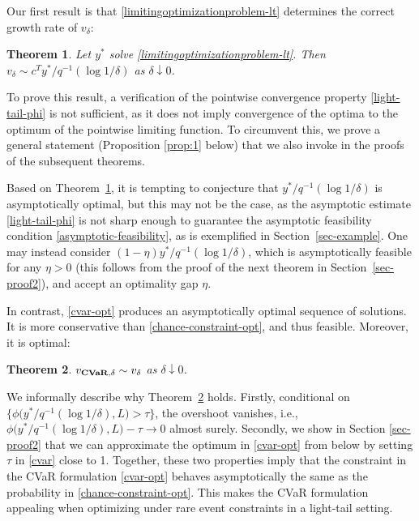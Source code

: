 \documentclass[a4paper, a4wide, 10pt, reqno]{amsart}
\theoremstyle{plain}
\newtheorem{theorem}{Theorem}
\begin{document}
\smallskip
Our first result is that \eqref{limitingoptimizationproblem-lt} determines the correct growth rate of $v_\delta$:
\begin{theorem}\label{thm:lt-ccp}
Let $y^*$ solve \eqref{limitingoptimizationproblem-lt}. 
Then  
$v_\delta\sim c^T y^*/q^{-1}(\log 1/\delta) $ as $\delta\downarrow 0$.
\end{theorem}

To prove this result, a verification of the pointwise convergence property \eqref{light-tail-phi} is not sufficient, as it does not imply convergence of the optima to the optimum of the pointwise limiting function. To circumvent this, we prove a general statement (Proposition \ref{prop:1} below) that we also invoke in the proofs of the subsequent theorems.

\smallskip
Based on Theorem~\ref{thm:lt-ccp}, it is tempting to conjecture that $y^*/q^{-1}(\log 1/\delta)$ is asymptotically optimal, but this may not be the case, as the asymptotic estimate \eqref{light-tail-phi} is not sharp enough to guarantee the asymptotic feasibility condition \eqref{asymptotic-feasibility}, as is exemplified in Section~\ref{sec-example}. One may instead consider $(1-\eta) y^*/q^{-1}(\log 1/\delta)$, which is asymptotically feasible for any $\eta>0$ (this follows from the proof of the next theorem in Section~\ref{sec-proof2}), and accept an optimality gap $\eta$.

\smallskip
In contrast, \eqref{cvar-opt} produces an asymptotically optimal sequence of solutions. It is more conservative than \eqref{chance-constraint-opt}, and thus feasible. Moreover, it is optimal: 

\begin{theorem}\label{thm:lt-cvar}
    $v_{{\bf CVaR}, \delta}\sim v_\delta$ 
     as $\delta\downarrow 0$.
\end{theorem}
We informally describe why Theorem~\ref{thm:lt-cvar} holds. Firstly, conditional on
$\{\phi\big(y^*/q^{-1}(\log 1/\delta),L\big)>\tau\}$, the overshoot vanishes, i.e., $\phi\big(y^*/q^{-1}(\log 1/\delta),L\big)-\tau\to 0$ almost surely. 
 Secondly, we show in Section \ref{sec-proof2} that we can approximate the optimum in \eqref{cvar-opt} from below by setting $\tau$ in \eqref{cvar} close to 1. Together, these two properties imply that the constraint in the CVaR formulation \eqref{cvar-opt} behaves asymptotically the same as the probability in \eqref{chance-constraint-opt}. This makes the CVaR formulation appealing when optimizing under rare event constraints in a light-tail setting. 
\end{document}
